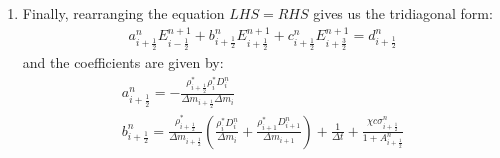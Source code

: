 \documentclass[11pt]{article}
\begin{document}
\begin{enumerate}
\begin{equation}
\begin{gathered}
  + \left[\frac{\rho_{i+\frac{1}{2}}^{*}}{\Delta m_{i+\frac{1}{2}}}\left(\frac{ \rho_{i}^* D_{i}^n}{ \Delta m_{i}}+\frac{ \rho_{i+1}^* D_{i+1}^n}{ \Delta m_{i+1}}\right) + \frac{1}{\Delta t}\right] E_{i+\frac{1}{2}}^{n+1} \\
  - \left(\frac{\rho_{i+\frac{1}{2}}^{*} \rho_{i+1}^* D_{i+1}^n}{\Delta m_{i+\frac{1}{2}} \Delta m_{i+1}}\right) E_{i+\frac{3}{2}}^{n+1} \\
  - \frac{1}{\Delta t} E_{i+\frac{1}{2}}^n
  \end{gathered}
  \end{equation}
  \underline{RHS:}
  Substituting the expression for $[U_R]_{i+\frac{1}{2}}^{n+1}$ gives:
  \begin{equation}
    \begin{gathered}
  RHS = \chi c \sigma_{i+\frac{1}{2}}^{n} \left(\frac{A_{i+\frac{1}{2}}^n}{1 + A_{i+\frac{1}{2}}^n} E_{i+\frac{1}{2}}^{n+1} + \frac{1}{1 + A_{i+\frac{1}{2}}^n}[U_R]_{i+\frac{1}{2}}^n - E_{i+\frac{1}{2}}^{n+1}\right) \\
  = \chi c \sigma_{i+\frac{1}{2}}^{n}
  \left(\frac{1}{1 + A_{i+\frac{1}{2}}^n}[U_R]_{i+\frac{1}{2}}^n -\frac{1}{1 + A_{i+\frac{1}{2}}^n} E_{i+\frac{1}{2}}^{n+1}\right) \\
  = \frac{\chi c \sigma_{i+\frac{1}{2}}^{n}}{1 + A_{i+\frac{1}{2}}^n}[U_R]_{i+\frac{1}{2}}^n - \frac{\chi c \sigma_{i+\frac{1}{2}}^{n}}{1 + A_{i+\frac{1}{2}}^n} E_{i+\frac{1}{2}}^{n+1} 
  \end{gathered}
  \end{equation}
  \item Finally, rearranging the equation $LHS = RHS$ gives us the tridiagonal form:
  \begin{equation}
    \begin{gathered}
     a_{i+\frac{1}{2}}^n E_{i-\frac{1}{2}}^{n+1} + b_{i+\frac{1}{2}}^n E_{i+\frac{1}{2}}^{n+1} + c_{i+\frac{1}{2}}^n E_{i+\frac{3}{2}}^{n+1} = d_{i+\frac{1}{2}}^n
    \end{gathered}
  \end{equation}
  and the coefficients are given by:
  \begin{gather}
    \boxed{a_{i+\frac{1}{2}}^n = -\frac{\rho_{i+\frac{1}{2}}^{*} \rho_i^* D_i^n}{\Delta m_{i+\frac{1}{2}} \Delta m_{i}}} \\
    \boxed{b_{i+\frac{1}{2}}^n = \frac{\rho_{i+\frac{1}{2}}^{*}}{\Delta m_{i+\frac{1}{2}}}\left(\frac{ \rho_{i}^* D_{i}^n}{ \Delta m_{i}}+\frac{ \rho_{i+1}^* D_{i+1}^n}{ \Delta m_{i+1}}\right) + \frac{1}{\Delta t} + \frac{\chi c \sigma_{i+\frac{1}{2}}^{n}}{1 + A_{i+\frac{1}{2}}^n}} \\

\end{gather}
\end{enumerate}
\end{document}
